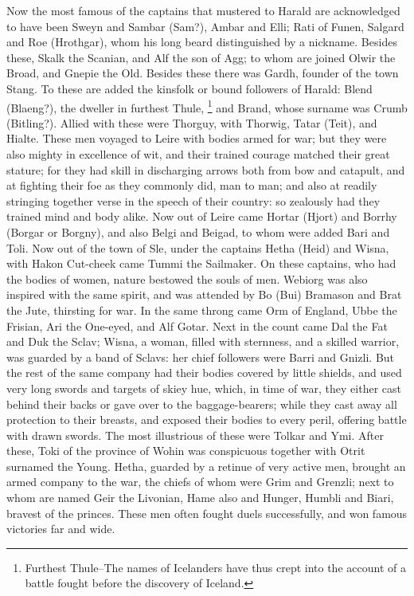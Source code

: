 \documentclass[10pt,a4paper]{report}
\begin{document}
Now the most famous of the captains that mustered to Harald are acknowledged to have been Sweyn and Sambar (Sam?), Ambar and Elli; Rati of Funen, Salgard and Roe (Hrothgar), whom his long beard distinguished by a nickname. Besides these, Skalk the Scanian, and Alf the son of Agg; to whom are joined Olwir the Broad, and Gnepie the Old. Besides these there was Gardh, founder of the town Stang. To these are added the kinsfolk or bound followers of Harald: Blend (Blaeng?), the dweller in furthest Thule, \footnote{Furthest Thule--The names of Icelanders have thus crept into the account of a battle fought before the discovery of Iceland.} and Brand, whose surname was Crumb (Bitling?). Allied with these were Thorguy, with Thorwig, Tatar (Teit), and Hialte. These men voyaged to Leire with bodies armed for war; but they were also mighty in excellence of wit, and their trained courage matched their great stature; for they had skill in discharging arrows both from bow and catapult, and at fighting their foe as they commonly did, man to man; and also at readily stringing together verse in the speech of their country: so zealously had they trained mind and body alike. Now out of Leire came Hortar (Hjort) and Borrhy (Borgar or Borgny), and also Belgi and Beigad, to whom were added Bari and Toli. Now out of the town of Sle, under the captains Hetha (Heid) and Wisna, with Hakon Cut-cheek came Tummi the Sailmaker. On these captains, who had the bodies of women, nature bestowed the souls of men. Webiorg was also inspired with the same spirit, and was attended by Bo (Bui) Bramason and Brat the Jute, thirsting for war. In the same throng came Orm of England, Ubbe the Frisian, Ari the One-eyed, and Alf Gotar. Next in the count came Dal the Fat and Duk the Sclav; Wisna, a woman, filled with sternness, and a skilled warrior, was guarded by a band of Sclavs: her chief followers were Barri and Gnizli. But the rest of the same company had their bodies covered by little shields, and used very long swords and targets of skiey hue, which, in time of war, they either cast behind their backs or gave over to the baggage-bearers; while they cast away all protection to their breasts, and exposed their bodies to every peril, offering battle with drawn swords. The most illustrious of these were Tolkar and Ymi. After these, Toki of the province of Wohin was conspicuous together with Otrit surnamed the Young. Hetha, guarded by a retinue of very active men, brought an armed company to the war, the chiefs of whom were Grim and Grenzli; next to whom are named Geir the Livonian, Hame also and Hunger, Humbli and Biari, bravest of the princes. These men often fought duels successfully, and won famous victories far and wide.\\
\end{document}
